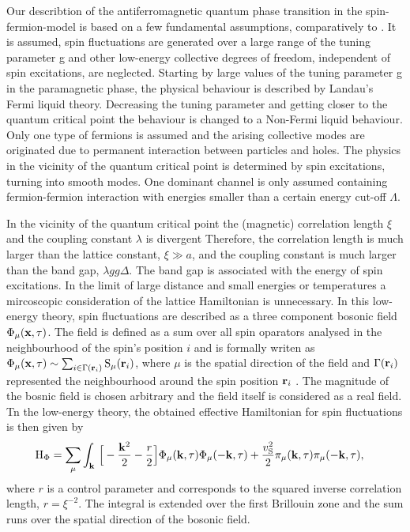 Our describtion of the antiferromagnetic quantum phase transition in the spin-fermion-model is based on a few fundamental assumptions, comparatively to \cite{Abanov&Chubukov&Schmalian}.
It is assumed, spin fluctuations are generated over a large range of the tuning parameter g and other low-energy collective degrees of freedom, independent of spin excitations, are neglected.
Starting by large values of the tuning parameter g in the paramagnetic phase, the physical behaviour is described by Landau's Fermi liquid theory.
Decreasing the tuning parameter and getting closer to the quantum critical point the behaviour is changed to a Non-Fermi liquid behaviour.
Only one type of fermions is assumed and the arising collective modes are originated due to permanent interaction between particles and holes.
The physics in the vicinity of the quantum critical point is determined by spin excitations, turning into smooth modes.
One dominant channel is only assumed containing fermion-fermion interaction with energies smaller than a certain energy cut-off $\Lambda$.

In the vicinity of the quantum critical point the (magnetic) correlation length $\xi$ and the coupling constant $\lambda$ is divergent
Therefore, the correlation length is much larger than the lattice constant, $\xi \gg a$, and the coupling constant is much larger than the band gap, $\lambda gg \Delta$. 
The band gap is associated with the energy of spin excitations.
In the limit of large distance and small energies or temperatures a mircoscopic consideration of the lattice Hamiltonian is unnecessary.
In this low-energy theory, spin fluctuations are described as a three component bosonic field $\Phi_{\mu}(\vb{x}, \tau)$.
The field is defined as a sum over all spin oparators analysed in the neighbourhood of the spin's position $i$ and is formally writen as $\Phi_{\mu}(\vb{x}, \tau) \sim \sum_{i \in \Gamma(\vb{r}_{i})} \mathrm{S}_{\mu}(\vb{r}_{i})$, where $\mu$ is the spatial direction of the field and $\Gamma(\vb{r}_{i})$ represented the neighbourhood around the spin position $\vb{r}_{i}$ \cite{SachdevQCP}.
The magnitude of the bosnic field is chosen arbitrary and the field itself is considered as a real field.
Tn the low-energy theory, the obtained effective Hamiltonian for spin fluctuations is then given by
%
\begin{align}
	\mathrm{H}_{\Phi} &= 
	 	\sum\limits_{\mu} \int_{\vb{k}}\, \Big[
	 	-\frac{\vb{k}^{2}}{2} - \frac{r}{2}\Big] \Phi_{\mu}(\vb{k},\tau) \Phi_{\mu}(-\vb{k},\tau)
		+
		\frac{v_{\mathrm{S}}^{2}}{2} \pi_{\mu}(\vb{k},\tau) \pi_{\mu}(-\vb{k},\tau),
	\label{eq:Hamiltonian spin fluctuation}
\end{align}
%
where $r$ is a control parameter and corresponds to the squared inverse correlation length, $r = \xi^{-2}$.
The integral is extended over the first Brillouin zone and the sum runs over the spatial direction of the bosonic field.


